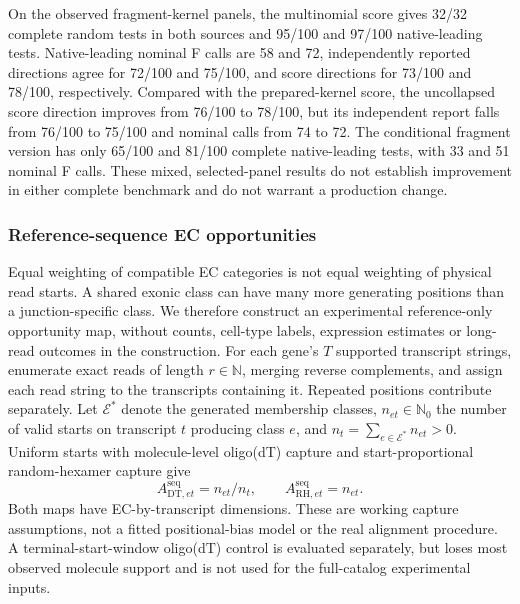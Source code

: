 \documentclass[11pt]{article}
\begin{document}
On the observed fragment-kernel panels, the multinomial score gives 32/32 complete random tests in both sources and 95/100 and 97/100 native-leading tests. Native-leading nominal F calls are 58 and 72, independently reported directions agree for 72/100 and 75/100, and score directions for 73/100 and 78/100, respectively. Compared with the prepared-kernel score, the uncollapsed score direction improves from 76/100 to 78/100, but its independent report falls from 76/100 to 75/100 and nominal calls from 74 to 72. The conditional fragment version has only 65/100 and 81/100 complete native-leading tests, with 33 and 51 nominal F calls. These mixed, selected-panel results do not establish improvement in either complete benchmark and do not warrant a production change.

\subsubsection*{Reference-sequence EC opportunities}

Equal weighting of compatible EC categories is not equal weighting of physical read starts. A shared exonic class can have many more generating positions than a junction-specific class. We therefore construct an experimental reference-only opportunity map, without counts, cell-type labels, expression estimates or long-read outcomes in the construction. For each gene's \(T\) supported transcript strings, enumerate exact reads of length \(r\in\mathbb N\), merging reverse complements, and assign each read string to the transcripts containing it. Repeated positions contribute separately. Let \(\mathcal E^*\) denote the generated membership classes, \(n_{et}\in\mathbb N_0\) the number of valid starts on transcript \(t\) producing class \(e\), and \(n_t=\sum_{e\in\mathcal E^*}n_{et}>0\). Uniform starts with molecule-level oligo(dT) capture and start-proportional random-hexamer capture give \begin{equation}A^{\mathrm{seq}}_{\mathrm{DT},et}=n_{et}/n_t,\qquad A^{\mathrm{seq}}_{\mathrm{RH},et}=n_{et}.\end{equation} Both maps have EC-by-transcript dimensions. These are working capture assumptions, not a fitted positional-bias model or the real alignment procedure. A terminal-start-window oligo(dT) control is evaluated separately, but loses most observed molecule support and is not used for the full-catalog experimental inputs.
\end{document}
